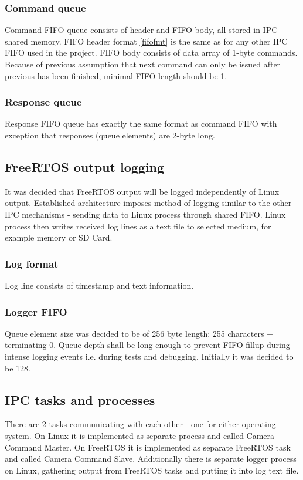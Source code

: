 \subsubsection{Command queue}
Command FIFO queue consists of header and FIFO body, all stored in IPC shared memory. FIFO header format \ref{fifofmt} is the same as for any other IPC FIFO used in the project. FIFO body consists of data array of 1-byte commands. Because of previous assumption that next command can only be issued after previous has been finished, minimal FIFO length should be 1.

\subsubsection{Response queue}
Response FIFO queue has exactly the same format as command FIFO with exception that responses (queue elements) are 2-byte long.

\subsection{FreeRTOS output logging}
It was decided that FreeRTOS output will be logged independently of Linux output. Established architecture imposes method of logging similar to the other IPC mechanisms - sending data to Linux process through shared FIFO. Linux process then writes received log lines as a text file to selected medium, for example memory or SD Card.

\subsubsection{Log format}
Log line consists of timestamp and text information.

\subsubsection{Logger FIFO}
Queue element size was decided to be of 256 byte length: 255 characters + terminating 0. Queue depth shall be long enough to prevent FIFO fillup during intense logging events i.e. during tests and debugging. Initially it was decided to be 128.

\subsection{IPC tasks and processes}
There are 2 tasks communicating with each other - one for either operating system. On Linux it is implemented as separate process and called Camera Command Master. On FreeRTOS it is implemented as separate FreeRTOS task and called Camera Command Slave. Additionally there is separate logger process on Linux, gathering output from FreeRTOS tasks and putting it into log text file.

